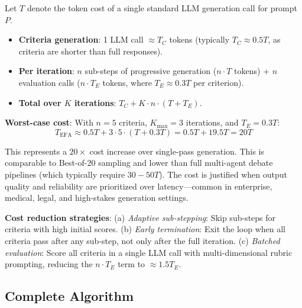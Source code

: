 \documentclass[11pt]{article}
\begin{document}
Let $T$ denote the token cost of a single standard LLM generation call for prompt $P$.

\begin{itemize}[leftmargin=*]
    \item \textbf{Criteria generation}: 1 LLM call $\approx T_C$ tokens (typically $T_C \approx 0.5T$, as criteria are shorter than full responses).
    \item \textbf{Per iteration}: $n$ sub-steps of progressive generation ($n \cdot T$ tokens) + $n$ evaluation calls ($n \cdot T_E$ tokens, where $T_E \approx 0.3T$ per criterion).
    \item \textbf{Total over $K$ iterations}: $T_C + K \cdot n \cdot (T + T_E)$.
\end{itemize}

\textbf{Worst-case cost}: With $n = 5$ criteria, $K_{\max} = 3$ iterations, and $T_E = 0.3T$:
\begin{equation}
    T_{\text{EFA}} \approx 0.5T + 3 \cdot 5 \cdot (T + 0.3T) = 0.5T + 19.5T = 20T
\end{equation}

This represents a $20\times$ cost increase over single-pass generation. This is comparable to Best-of-20 sampling and lower than full multi-agent debate pipelines (which typically require $30{-}50T$). The cost is justified when output quality and reliability are prioritized over latency---common in enterprise, medical, legal, and high-stakes generation settings.

\textbf{Cost reduction strategies}: (a) \emph{Adaptive sub-stepping}: Skip sub-steps for criteria with high initial scores. (b) \emph{Early termination}: Exit the loop when all criteria pass after any sub-step, not only after the full iteration. (c) \emph{Batched evaluation}: Score all criteria in a single LLM call with multi-dimensional rubric prompting, reducing the $n \cdot T_E$ term to $\approx 1.5 T_E$.

\subsection{Complete Algorithm}
\end{document}
